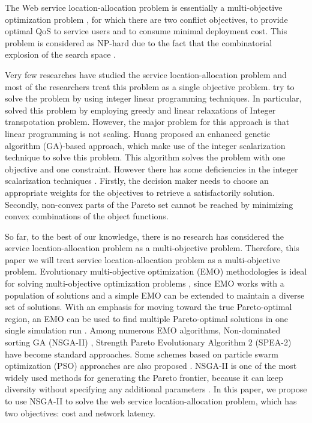 \documentclass{llncs}
\begin{document}
The Web service location-allocation problem is essentially a multi-objective optimization problem \cite{Multiobjective}, for which there are two conflict objectives, to provide optimal 
QoS to service users and to consume minimal deployment cost.
This problem is considered as NP-hard due to the fact that the combinatorial explosion of the search space \cite{Vanrompay}. 


Very few researches have studied the service location-allocation problem and most of the researchers treat this problem as a single objective problem.
\cite{Aboolian} \cite{Sun} try to solve the problem by using integer linear programming techniques.
In particular, \cite{Sun} solved this problem by employing greedy and linear relaxations of Integer 
transpotation problem.
However, the major problem for this approach is that linear programming is not scaling.
Huang \cite{EnhancedGenetic} proposed an enhanced genetic algorithm (GA)-based approach, which make use of the integer scalarization technique to solve this problem.
This algorithm solves the problem with one objective and one constraint. However there has some deficiencies in the
integer scalarization techniques \cite{Multiobjective}. Firstly, the decision maker needs to choose an appropriate weights for the objectives to retrieve a satisfactorily solution. 
Secondly, non-convex parts of the Pareto set cannot be reached by minimizing convex combinations of the object functions.


So far, to the best of our knowledge, there is no research has considered the service location-allocation problem as a multi-objective problem. Therefore, this paper we will treat service location-allocation problem as a multi-objective problem. Evolutionary multi-objective optimization (EMO) methodologies
 is ideal for solving multi-objective optimization problems \cite{key:article}, since EMO works with a population of solutions and 
a simple EMO can be extended to maintain a diverse set of solutions.
With an emphasis for moving toward the true Pareto-optimal region, an EMO can be used to find multiple Pareto-optimal solutions in 
one single simulation run \cite{OptimizationElectrical}. Among numerous EMO algorithms,
Non-dominated sorting GA (NSGA-II) \cite{996017}, Strength Pareto Evolutionary Algorithm 2 (SPEA-2) \cite{Deb} have become standard approaches. 
Some schemes based on particle swarm optimization (PSO) approaches are also proposed \cite{Elhossini} \cite{Huang}.
NSGA-II is one of the most widely used methods for generating the Pareto frontier, because it can keep diversity without specifying any additional parameters \cite{Deb06referencepoint}.
In this paper, we propose to use NSGA-II to solve the web service location-allocation problem, which has two objectives:
cost and network latency.
\end{document}
